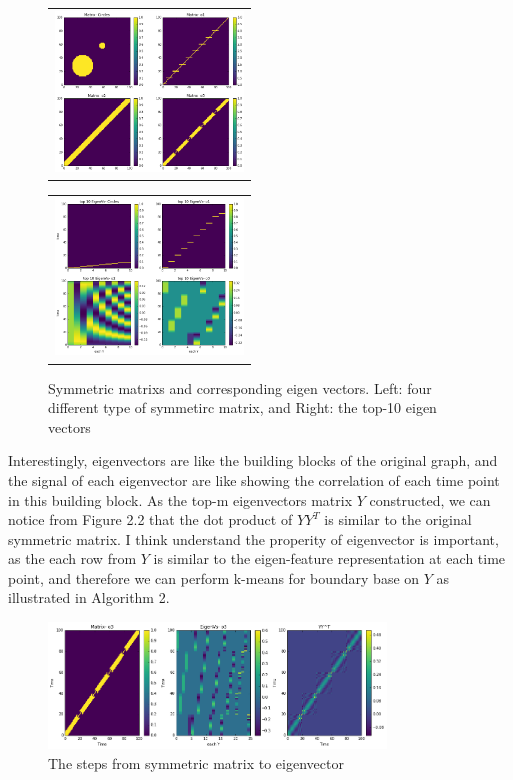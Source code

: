 \documentclass[final]{siamltexmm}
\begin{document}
\begin{figure}[H]
\centering
\begin{subfigure}
  \begin{tabular}{c}
  \includegraphics[width=50mm]{./figure/similarityMatrix.png}
  \end{tabular}{}
\end{subfigure}
  \begin{tabular}{c}
  \includegraphics[width=50mm]{./figure/similarityMatrix_eigens.png}
  \end{tabular}{}
\begin{subfigure}
\end{subfigure}
\caption{Symmetric matrixs and corresponding eigen vectors. Left: four different type of symmetirc matrix, and Right: the top-10 eigen vectors}
\end{figure}
Interestingly, eigenvectors are like the building blocks of the original graph, and the signal of each eigenvector are like showing the correlation of each time point in this building block. As the top-m eigenvectors matrix $Y$ constructed, we can notice from Figure 2.2 that the dot product of $YY^T$ is similar to the original symmetric matrix. I think understand the properity of eigenvector is important, as the each row from $Y$ is similar to the eigen-feature representation at each time point, and therefore we can perform k-means for boundary base on $Y$ as illustrated in Algorithm 2.
\begin{figure}[H]
  \centering
    \includegraphics[width=0.8\textwidth]{./figure/o3_eachStage.png}
  \caption{The steps from symmetric matrix to eigenvector}
\end{figure}
\end{document}

